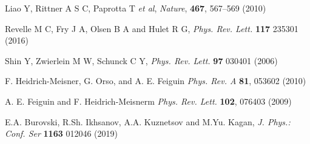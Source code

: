 \documentclass[a0,portrait]{a0poster}
\begin{document}
\begin{multicols}{2}

\begin{thebibliography}{}

Liao Y, Rittner A S C, Paprotta T \textit{et al}, \textit{Nature}, \textbf{467}, 567–569 (2010)

Revelle M C, Fry J A, Olsen B A and Hulet R G, \textit{Phys. Rev. Lett.} \textbf{117} 235301 (2016)

Shin Y, Zwierlein M W, Schunck C Y, \textit{Phys. Rev. Lett.}  \textbf{97} 030401 (2006)

 F. Heidrich-Meisner, G. Orso, and A. E. Feiguin
\textit{Phys. Rev. A} \textbf{81}, 053602 (2010) 

 A. E. Feiguin and F. Heidrich-Meisnerm \textit{Phys. Rev. Lett.} \textbf{102}, 076403 (2009) 

E.A. Burovski, R.Sh. Ikhsanov, A.A. Kuznetsov and M.Yu. Kagan, \textit{J. Phys.: Conf. Ser} \textbf{1163} 012046 (2019) 

\end{thebibliography}

\end{multicols}
\end{document}
